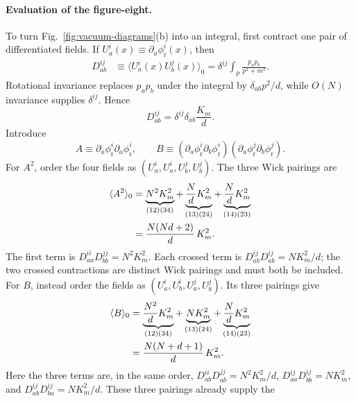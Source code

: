 \paragraph{Evaluation of the figure-eight.}
To turn Fig.~\ref{fig:vacuum-diagrams}(b) into an integral, first contract one
pair of differentiated fields.  If
$U_a^i(x)\equiv\partial_a\phi_{\mathrm r}^i(x)$, then
\begin{align}
  D_{ab}^{ij}
  &\equiv \langle U_a^i(x)U_b^j(x)\rangle_0
  =\delta^{ij}\int_p\frac{p_a p_b}{p^2+m^2}.
  \label{eq:derivative-propagator-before-rotation}
\end{align}
Rotational invariance replaces $p_a p_b$ under the integral by
$\delta_{ab}p^2/d$, while $O(N)$ invariance supplies $\delta^{ij}$.  Hence
\begin{equation}
  D_{ab}^{ij}=\delta^{ij}\delta_{ab}\frac{K_m}{d} .
  \label{eq:derivative-tadpole-tensor}
\end{equation}
Introduce
\begin{equation}
  A \equiv
  \partial_a\phi_{\mathrm r}^i\partial_a\phi_{\mathrm r}^i,
  \qquad
  B \equiv
  (\partial_a\phi_{\mathrm r}^i\partial_b\phi_{\mathrm r}^i)
  (\partial_a\phi_{\mathrm r}^j\partial_b\phi_{\mathrm r}^j).
\end{equation}
For $A^2$, order the four fields as
$(U_a^i,U_a^i,U_b^j,U_b^j)$.  The three Wick pairings are
\begin{align}
  \langle A^2\rangle_0
  &= \underbrace{N^2K_m^2}_{(12)(34)}
     +\underbrace{\frac{N}{d}K_m^2}_{(13)(24)}
     +\underbrace{\frac{N}{d}K_m^2}_{(14)(23)}
  \notag\\
  &= \frac{N(Nd+2)}{d}\,K_m^2 .
  \label{eq:A2-wick-result}
\end{align}
The first term is
$D_{aa}^{ii}D_{bb}^{jj}=N^2K_m^2$.  Each crossed term is
$D_{ab}^{ij}D_{ab}^{ij}=NK_m^2/d$; the two crossed contractions are distinct
Wick pairings and must both be included.
For $B$, instead order the fields as
$(U_a^i,U_b^i,U_a^j,U_b^j)$.  Its three pairings give
\begin{align}
  \langle B\rangle_0
  &= \underbrace{\frac{N^2}{d}K_m^2}_{(12)(34)}
     +\underbrace{NK_m^2}_{(13)(24)}
     +\underbrace{\frac{N}{d}K_m^2}_{(14)(23)}
  \notag\\
  &= \frac{N(N+d+1)}{d}\,K_m^2 .
  \label{eq:B-wick-result}
\end{align}
Here the three terms are, in the same order,
$D_{ab}^{ii}D_{ab}^{jj}=N^2K_m^2/d$,
$D_{aa}^{ij}D_{bb}^{ij}=NK_m^2$, and
$D_{ab}^{ij}D_{ba}^{ij}=NK_m^2/d$.  These three pairings already supply the
